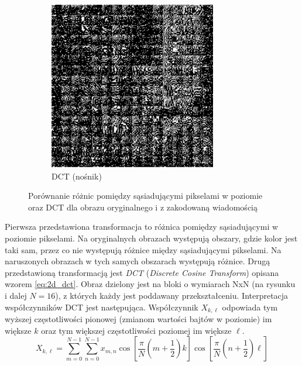 \documentclass[a4paper,12pt]{article}
\begin{document}
\begin{figure}[h]
\begin{subfigure}{0.3\textwidth}
                \includegraphics[width=\textwidth]{img/dct_stego.png}
                \caption{DCT (nośnik)}
            \end{subfigure}
        
            \caption{Porównanie różnic pomiędzy sąsiadującymi pikselami w poziomie oraz DCT dla obrazu oryginalnego i z zakodowaną wiadomością}
            \label{compare_dct_diff}
        \end{figure}
        
        Pierwsza przedstawiona transformacja to różnica pomiędzy sąsiadującymi w poziomie pikselami. Na oryginalnych obrazach występują obszary, gdzie kolor jest taki sam, przez co nie występują różnice między sąsiadującymi pikselami. Na naruszonych obrazach w tych samych obszarach występują różnice. Drugą przedstawioną transformacją jest \textit{DCT} (\textit{Discrete Cosine Transform}) opisana wzorem \ref{eq:2d_dct}. Obraz dzielony jest na bloki o wymiarach NxN (na rysunku i dalej $N=16$), z których każdy jest poddawany przekształceniu. Interpretacja współczynników DCT jest następująca. Współczynnik $X_{k,\ell}$ odpowiada tym wyższej częstotliwości pionowej (zmianom wartości bajtów w poziomie) im większe $k$ oraz tym większej częstotliwości poziomej im większe $\ell$.
        \begin{equation}
            X_{k,\ell} = \sum_{m=0}^{N-1} \sum_{n=0}^{N-1} x_{m,n} \cos \left[ \frac{\pi}{N} \left(m + \frac{1}{2}\right) k \right] \cos \left[ \frac{\pi}{N} \left(n + \frac{1}{2}\right) \ell \right]
        \label{eq:2d_dct}
        \end{equation}
\end{document}
